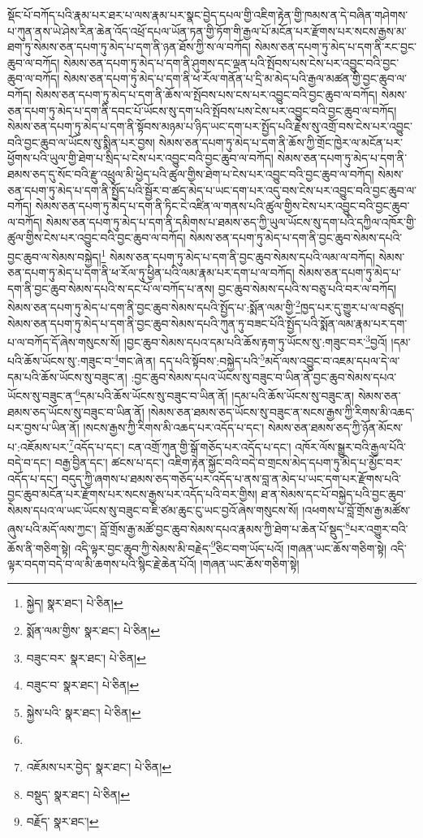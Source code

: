 སྡོང་པོ་བཀོད་པའི་རྣམ་པར་ཐར་པ་ལས་རྣམ་པར་སྣང་བྱེད་དཔལ་གྱི་འཇིག་རྟེན་གྱི་ཁམས་ན་དེ་བཞིན་གཤེགས་པ་ཀུན་ནས་ཡེ་ཤེས་རིན་ཆེན་འོད་འཕྲོ་དཔལ་ཡོན་ཏན་གྱི་ཏོག་གི་རྒྱལ་པོ་མངོན་པར་རྫོགས་པར་སངས་རྒྱས་མ་ཐག་ཏུ་སེམས་ཅན་དཔག་ཏུ་མེད་པ་དག་ནི་ཉན་ཐོས་ཀྱི་ས་ལ་བཀོད། སེམས་ཅན་དཔག་ཏུ་མེད་པ་དག་ནི་རང་བྱང་ཆུབ་ལ་བཀོད། སེམས་ཅན་དཔག་ཏུ་མེད་པ་དག་ནི་ཤུགས་དང་ལྡན་པའི་སྤོབས་པས་ངེས་པར་འབྱུང་བའི་བྱང་ཆུབ་ལ་བཀོད། སེམས་ཅན་དཔག་ཏུ་མེད་པ་དག་ནི་ཕ་རོལ་གནོན་པ་དྲི་མ་མེད་པའི་རྒྱལ་མཚན་གྱི་བྱང་ཆུབ་ལ་བཀོད། སེམས་ཅན་དཔག་ཏུ་མེད་པ་དག་ནི་ཆོས་ལ་སྤོབས་པས་ངས་པར་འབྱུང་བའི་བྱང་ཆུབ་ལ་བཀོད། སེམས་ཅན་དཔག་ཏུ་མེད་པ་དག་ནི་དབང་པོ་ཡོངས་སུ་དག་པའི་སྤོབས་པས་ངེས་པར་འབྱུང་བའི་བྱང་ཆུབ་ལ་བཀོད། སེམས་ཅན་དཔག་ཏུ་མེད་པ་དག་ནི་སྟོབས་མཉམ་པ་ཉིད་ཡང་དག་པར་སྤྱོད་པའི་རྗེས་སུ་འགྲོ་བས་ངེས་པར་འབྱུང་བའི་བྱང་ཆུབ་ལ་ཡོངས་སུ་སྨིན་པར་བྱས། སེམས་ཅན་དཔག་ཏུ་མེད་པ་དག་ནི་ཆོས་ཀྱི་གྲོང་ཁྱེར་ལ་མངོན་པར་ཕྱོགས་པའི་ཡུལ་གྱི་ཐེག་པ་སྲིད་པ་ངེས་པར་འབྱུང་བའི་བྱང་ཆུབ་ལ་བཀོད། སེམས་ཅན་དཔག་ཏུ་མེད་པ་དག་ནི་ཐམས་ཅད་དུ་སོང་བའི་རྫུ་འཕྲུལ་མི་ཕྱེད་པའི་ཚུལ་གྱིས་ཐེག་པ་ངེས་པར་འབྱུང་བའི་བྱང་ཆུབ་ལ་བཀོད། སེམས་ཅན་དཔག་ཏུ་མེད་པ་དག་ནི་སྤྱོད་པའི་སྦྱོར་བ་ཚད་མེད་པ་ཡང་དག་པར་འདུ་བས་ངེས་པར་འབྱུང་བའི་བྱང་ཆུབ་ལ་བཀོད། སེམས་ཅན་དཔག་ཏུ་མེད་པ་དག་ནི་ཏིང་ངེ་འཛིན་ལ་གནས་པའི་ཚུལ་གྱིས་ངེས་པར་འབྱུང་བའི་བྱང་ཆུབ་ལ་བཀོད། སེམས་ཅན་དཔག་ཏུ་མེད་པ་དག་ནི་དམིགས་པ་ཐམས་ཅད་ཀྱི་ཡུལ་ཡོངས་སུ་དག་པའི་དཀྱིལ་འཁོར་གྱི་ཚུལ་གྱིས་ངེས་པར་འབྱུང་བའི་བྱང་ཆུབ་ལ་བཀོད། སེམས་ཅན་དཔག་ཏུ་མེད་པ་དག་ནི་བྱང་ཆུབ་སེམས་དཔའི་བྱང་ཆུབ་ལ་སེམས་བསྐྱེད།\footnote{སྐྱེད།  སྣར་ཐང་།  པེ་ཅིན། } སེམས་ཅན་དཔག་ཏུ་མེད་པ་དག་ནི་བྱང་ཆུབ་སེམས་དཔའི་ལམ་ལ་བཀོད། སེམས་ཅན་དཔག་ཏུ་མེད་པ་དག་ནི་ཕ་རོལ་ཏུ་ཕྱིན་པའི་ལམ་རྣམ་པར་དག་པ་ལ་བཀོད། སེམས་ཅན་དཔག་ཏུ་མེད་པ་དག་ནི་བྱང་ཆུབ་སེམས་དཔའི་ས་དང་པོ་ལ་བཀོད་པ་ནས། བྱང་ཆུབ་སེམས་དཔའི་ས་བཅུ་པའི་བར་ལ་བཀོད། སེམས་ཅན་དཔག་ཏུ་མེད་པ་དག་ནི་བྱང་ཆུབ་སེམས་དཔའི་སྤྱོད་པ་:སྨོན་ལམ་གྱི་\footnote{སྨོན་ལམ་གྱིས་  སྣར་ཐང་།  པེ་ཅིན། }ཁྱད་པར་དུ་གྱུར་པ་ལ་བཙུད། སེམས་ཅན་དཔག་ཏུ་མེད་པ་དག་ནི་བྱང་ཆུབ་སེམས་དཔའི་ཀུན་ཏུ་བཟང་པོའི་སྤྱོད་པའི་སྨོན་ལམ་རྣམ་པར་དག་པ་ལ་བཀོད་དོ་ཞེས་གསུངས་སོ། །བྱང་ཆུབ་སེམས་དཔའ་དམ་པའི་ཆོས་རྟག་ཏུ་ཡོངས་སུ་:གཟུང་བར་\footnote{བཟུང་བར་  སྣར་ཐང་།  པེ་ཅིན། }བྱའོ། །དམ་པའི་ཆོས་ཡོངས་སུ་:གཟུང་བ་\footnote{བཟུང་བ་  སྣར་ཐང་།  པེ་ཅིན། }གང་ཞེ་ན། དད་པའི་སྟོབས་:བསྐྱེད་པའི་\footnote{སྐྱེས་པའི་  སྣར་ཐང་།  པེ་ཅིན། }མདོ་ལས་འབྱུང་བ་འཇམ་དཔལ་དེ་ལ་དམ་པའི་ཆོས་ཡོངས་སུ་བཟུང་ན། :བྱང་ཆུབ་སེམས་དཔའ་ཡོངས་སུ་བཟུང་བ་ཡིན་ནོ་བྱང་ཆུབ་སེམས་དཔའ་ཡོངས་སུ་བཟུང་ན་\footnote{}དམ་པའི་ཆོས་ཡོངས་སུ་བཟུང་བ་ཡིན་ནོ། །དམ་པའི་ཆོས་ཡོངས་སུ་བཟུང་ན། སེམས་ཅན་ཐམས་ཅད་ཡོངས་སུ་བཟུང་བ་ཡིན་ནོ། །སེམས་ཅན་ཐམས་ཅད་ཡོངས་སུ་བཟུང་ན་སངས་རྒྱས་ཀྱི་རིགས་མི་འཆད་པར་བྱས་པ་ཡིན་ནོ། །སངས་རྒྱས་ཀྱི་རིགས་མི་འཆད་པར་འདོད་པ་དང་། སེམས་ཅན་ཐམས་ཅད་ཀྱི་ཉོན་མོངས་པ་:འཇོམས་པར་\footnote{འཇོམས་པར་བྱེད་  སྣར་ཐང་།  པེ་ཅིན། }འདོད་པ་དང་། ངན་འགྲོ་ཀུན་གྱི་སྒོ་གཅོད་པར་འདོད་པ་དང་། འཁོར་ལོས་སྒྱུར་བའི་རྒྱལ་པོའི་བདེ་བ་དང་། བརྒྱ་བྱིན་དང་། ཚངས་པ་དང་། འཇིག་རྟེན་སྐྱོང་བའི་བདེ་བ་གྲངས་མེད་དཔག་ཏུ་མེད་པ་མྱོང་བར་འདོད་པ་དང་། བདུད་ཀྱི་ཞགས་པ་ཐམས་ཅད་གཅོད་པར་འདོད་པ་ནས་བླ་ན་མེད་པ་ཡང་དག་པར་རྫོགས་པའི་བྱང་ཆུབ་མངོན་པར་རྫོགས་པར་སངས་རྒྱས་པར་འདོད་པའི་བར་གྱིས། ཐ་ན་སེམས་དང་པོ་བསྐྱེད་པའི་བྱང་ཆུབ་སེམས་དཔའ་ལ་ཡང་ཡོངས་སུ་བཟུང་བ་ཇི་ཙམ་ཆུང་ངུ་ཡང་བྱའོ་ཞེས་གསུངས་སོ། །འཕགས་པ་བློ་གྲོས་རྒྱ་མཚོས་ཞུས་པའི་མདོ་ལས་ཀྱང་། བློ་གྲོས་རྒྱ་མཚོ་བྱང་ཆུབ་སེམས་དཔའ་རྣམས་ཀྱི་ཐེག་པ་ཆེན་པོ་སྡུད་\footnote{བསྡུད་  སྣར་ཐང་།  པེ་ཅིན། }པར་འགྱུར་བའི་ཆོས་ནི་གཅིག་སྟེ། འདི་ལྟར་བྱང་ཆུབ་ཀྱི་སེམས་མི་བརྗེད་\footnote{བརྗོད་  སྣར་ཐང་། }ཅིང་བག་ཡོད་པའོ། །གཞན་ཡང་ཆོས་གཅིག་སྟེ། འདི་ལྟར་བདག་བདེ་བ་ལ་མི་ཆགས་པའི་སྙིང་རྗེ་ཆེན་པོའོ། །གཞན་ཡང་ཆོས་གཅིག་སྟེ། 
